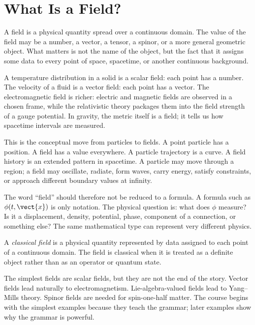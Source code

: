 \section{What Is a Field?}

A field is a physical quantity spread over a continuous domain. The value of the
field may be a number, a vector, a tensor, a spinor, or a more general geometric
object. What matters is not the name of the object, but the fact that it assigns
some data to every point of space, spacetime, or another continuous background.

A temperature distribution in a solid is a scalar field: each point has a
number. The velocity of a fluid is a vector field: each point has a vector. The
electromagnetic field is richer: electric and magnetic fields are observed in a
chosen frame, while the relativistic theory packages them into the field strength
of a gauge potential. In gravity, the metric itself is a field; it tells us how
spacetime intervals are measured.

This is the conceptual move from particles to fields. A point particle has a
position. A field has a value everywhere. A particle trajectory is a curve. A
field history is an extended pattern in spacetime. A particle may move through a
region; a field may oscillate, radiate, form waves, carry energy, satisfy
constraints, or approach different boundary values at infinity.

The word ``field'' should therefore not be reduced to a formula. A formula such
as \(\phi(t,\vect{x})\) is only notation. The physical question is: what does
\(\phi\) measure? Is it a displacement, density, potential, phase, component of a
connection, or something else? The same mathematical type can represent very
different physics.

\begin{definitionbox}
A \emph{classical field} is a physical quantity represented by data assigned to
each point of a continuous domain. The field is classical when it is treated as a
definite object rather than as an operator or quantum state.
\end{definitionbox}

The simplest fields are scalar fields, but they are not the end of the story.
Vector fields lead naturally to electromagnetism. Lie-algebra-valued fields lead
to Yang--Mills theory. Spinor fields are needed for spin-one-half matter. The
course begins with the simplest examples because they teach the grammar; later
examples show why the grammar is powerful.
